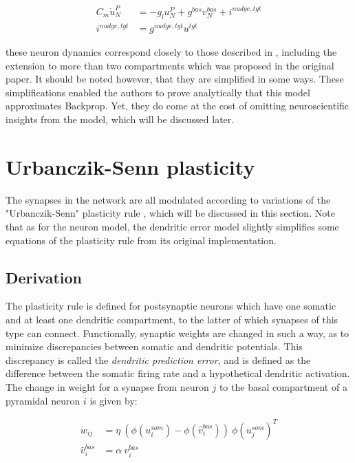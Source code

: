 \begin{align}
  C_m \dot{u}_N^P & = - g_l u_N^{P} + g^{bas} v_N^{bas} + i^{nudge, tgt} \\
  i^{nudge, tgt}  & = g^{nudge, tgt} u^{tgt}
\end{align}


these neuron dynamics correspond closely to those described in \citep{urbanczik2014learning}, including the extension to
more than two compartments which was proposed in the original paper. It should be noted however, that they are
simplified in some ways. These simplifications enabled the authors to prove analytically that this model approximates
Backprop. Yet, they do come at the cost of omitting neuroscientific insights from the model, which will be discussed
later.

\section{Urbanczik-Senn plasticity}\label{sec-urb-senn-plast}

The synapses in the network are all modulated according to variations of the "Urbanczik-Senn" plasticity rule
\citep{urbanczik2014learning}, which will be discussed in this section. Note that as for the neuron model, the dendritic
error model slightly simplifies some equations of the plasticity rule from its original implementation.

\subsection{Derivation}

The plasticity rule is defined for postsynaptic neurons which have one somatic and at least one dendritic compartment,
to the latter of which synapses of this type can connect. Functionally, synaptic weights are changed in such a way, as
to minimize discrepancies between somatic and dendritic potentials. This discrepancy is called the \textit{dendritic
prediction error}, and is defined as the difference between the somatic firing rate and a hypothetical dendritic
activation. The change in weight for a synapse from neuron $j$ to the basal compartment of a pyramidal neuron $i$ is
given by:

\begin{align}
  \dot{w}_{ij}    & = \eta \ ( \phi(u_i^{som}) - \phi(\hat{v}_i^{bas}) ) \ \phi(u_j^{som})^T \\
  \hat{v}_i^{bas} & = \alpha \  v_i^{bas}
\end{align}

